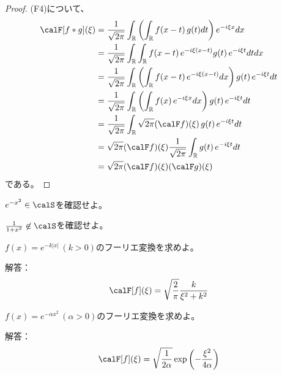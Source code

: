 \documentclass[report]{jlreq}
\begin{document}
\begin{proof}
    (F4)について、
    \begin{equation}
        \begin{split}
            \calF [f * g](\xi)
                &= \frac{1}{\sqrt{2\pi}} \int_\R \left( \int_\R f(x - t)\, g(t) dt \right) e^{-i\xi x} dx \\
                &= \frac{1}{\sqrt{2\pi}} \int_\R \int_\R f(x - t)\, e^{-i\xi (x - t)} g(t)\, e^{-i\xi t} dt dx \\
                &= \frac{1}{\sqrt{2\pi}} \int_\R
                    \left( \int_\R f(x - t)\, e^{-i\xi (x - t)} dx \right)
                    g(t)\, e^{-i\xi t} dt \\
                &= \frac{1}{\sqrt{2\pi}} \int_\R
                    \left( \int_\R f(x)\, e^{-i\xi x} dx \right)
                    g(t)\, e^{-i\xi t} dt \\
                &= \frac{1}{\sqrt{2\pi}} \int_\R
                    \sqrt{2\pi} (\calF f)(\xi)\,
                    g(t)\, e^{-i\xi t} dt \\
                &= \sqrt{2\pi} (\calF f)(\xi)
                    \frac{1}{\sqrt{2\pi}} \int_\R g(t)\, e^{-i\xi t} dt \\
                &= \sqrt{2\pi} (\calF f)(\xi) (\calF g)(\xi)
        \end{split}
    \end{equation}
    である。
\end{proof}





\begin{problem}
    $e^{-x^2} \in \calS$を確認せよ。
\end{problem}

\begin{problem}
    $\frac{1}{1+x^2} \not\in \calS$を確認せよ。
\end{problem}

\begin{problem}[ポアソン核]
    $f(x) = e^{-k|x|}\, (k > 0)$のフーリエ変換を求めよ。

    解答：
    \begin{equation}
        \calF[f](\xi) = \sqrt{\frac{2}{\pi}} \frac{k}{\xi^2 + k^2}
    \end{equation}
\end{problem}

\begin{problem}[ガウス核]
    $f(x) = e^{-\alpha x^2}\, (\alpha > 0)$のフーリエ変換を求めよ。

    解答：
    \begin{equation}
        \calF[f](\xi) = \sqrt{\frac{1}{2\alpha}} \exp\left(-\frac{\xi^2}{4\alpha}\right)
    \end{equation}
\end{problem}
\end{document}
